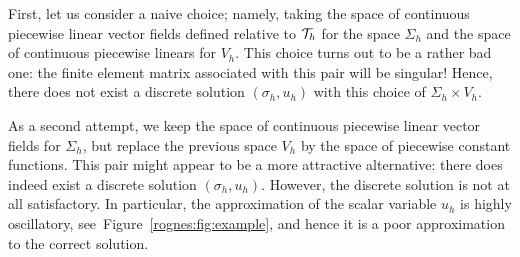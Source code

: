 First, let us consider a naive choice; namely, taking the space of
continuous piecewise linear vector fields defined relative to
$\mathcal{T}_h$ for the space $\Sigma_h$ and the space of continuous
piecewise linears for $V_h$. This choice turns out to be a rather bad
one: the finite element matrix associated with this pair will be
singular! Hence, there does not exist a discrete solution $(\sigma_h,
u_h)$ with this choice of $\Sigma_h \times V_h$.

As a second attempt, we keep the space of continuous piecewise linear
vector fields for $\Sigma_h$, but replace the previous space $V_h$ by
the space of piecewise constant functions. This pair might appear to
be a more attractive alternative: there does indeed exist a discrete
solution $(\sigma_h, u_h)$. However, the discrete solution is not at
all satisfactory. In particular, the approximation of the scalar
variable $u_h$ is highly oscillatory,
see~Figure~\ref{rognes:fig:example}, and hence
it is a poor approximation to the correct solution.
